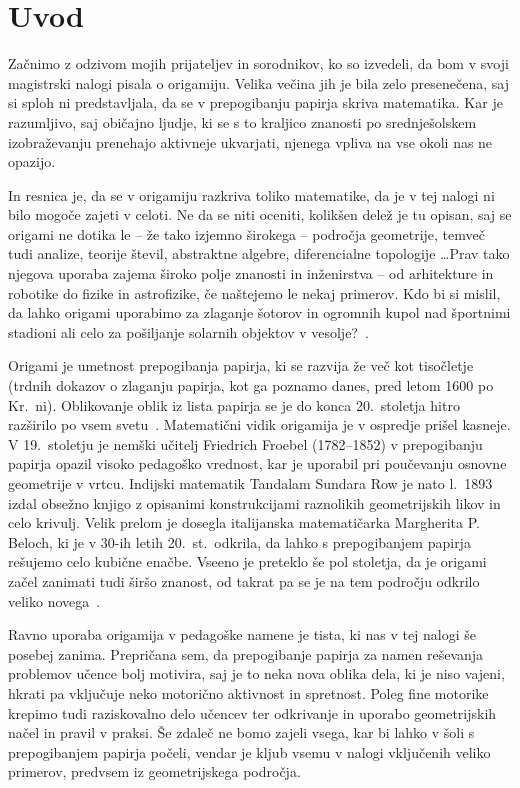 \section{Uvod}

Začnimo z odzivom mojih prijateljev in sorodnikov, ko so izvedeli, da bom v svoji magistrski nalogi pisala o origamiju. Velika večina jih je bila zelo presenečena, saj si sploh ni predstavljala, da se v prepogibanju papirja skriva matematika. Kar je razumljivo, saj običajno ljudje, ki se s to kraljico znanosti po srednješolskem izobraževanju prenehajo aktivneje ukvarjati, njenega vpliva na vse okoli nas ne opazijo.

In resnica je, da se v origamiju razkriva toliko matematike, da je v tej nalogi ni bilo mogoče zajeti v celoti. Ne da se niti oceniti, kolikšen delež je tu opisan, saj se origami ne dotika le -- že tako izjemno širokega -- področja geometrije, temveč tudi analize, teorije števil, abstraktne algebre, diferencialne topologije \ldots Prav tako njegova uporaba zajema široko polje znanosti in inženirstva -- od arhitekture in robotike do fizike in astrofizike, če naštejemo le nekaj primerov. Kdo bi si mislil, da lahko origami uporabimo za zlaganje šotorov in ogromnih kupol nad športnimi stadioni ali celo za pošiljanje solarnih objektov v vesolje?~\cite[str.\ 3--5]{hull2020}.

Origami je umetnost prepogibanja papirja, ki se razvija že več kot tisočletje (trdnih dokazov o zlaganju papirja, kot ga poznamo danes, pred letom 1600 po Kr.\ ni). Oblikovanje oblik iz lista papirja se je do konca 20.\ stoletja hitro razširilo po vsem svetu~\cite{robinson2024}. Matematični vidik origamija je v ospredje prišel kasneje. V 19.\ stoletju je nemški učitelj Friedrich Froebel (1782--1852) v prepogibanju papirja opazil visoko pedagoško vrednost, kar je uporabil pri poučevanju osnovne geometrije v vrtcu. Indijski matematik Tandalam Sundara Row je nato l.\ 1893 izdal obsežno knjigo z opisanimi konstrukcijami raznolikih geometrijskih likov in celo krivulj. Velik prelom je dosegla italijanska matematičarka Margherita P. Beloch, ki je v 30-ih letih 20.\ st.\ odkrila, da lahko s prepogibanjem papirja rešujemo celo kubične enačbe. Vseeno je preteklo še pol stoletja, da je origami začel zanimati tudi širšo znanost, od takrat pa se je na tem področju odkrilo veliko novega~\cite[str.\ 10]{hull2020}.

Ravno uporaba origamija v pedagoške namene je tista, ki nas v tej nalogi še posebej zanima. Prepričana sem, da prepogibanje papirja za namen reševanja problemov učence bolj motivira, saj je to neka nova oblika dela, ki je niso vajeni, hkrati pa vključuje neko motorično aktivnost in spretnost. Poleg fine motorike krepimo tudi raziskovalno delo učencev ter odkrivanje in uporabo geometrijskih načel in pravil v praksi. Še zdaleč ne bomo zajeli vsega, kar bi lahko v šoli s prepogibanjem papirja počeli, vendar je kljub vsemu v nalogi vključenih veliko primerov, predvsem iz geometrijskega področja.

